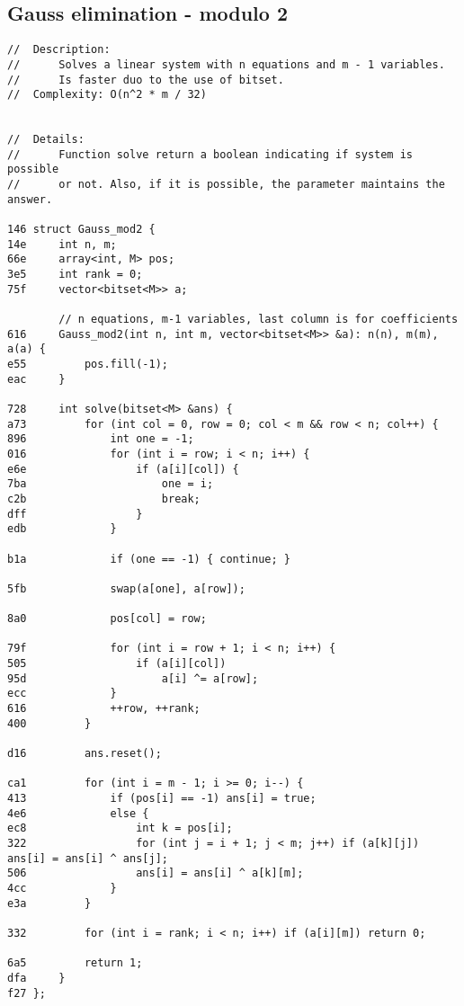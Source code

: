 \documentclass[11pt, a4paper, twoside]{article}
\begin{document}
\subsection{ Gauss elimination - modulo 2}
\begin{lstlisting}
//  Description: 
//      Solves a linear system with n equations and m - 1 variables.
//      Is faster duo to the use of bitset.
//  Complexity: O(n^2 * m / 32)


//  Details:
//      Function solve return a boolean indicating if system is possible
//      or not. Also, if it is possible, the parameter maintains the answer.

146 struct Gauss_mod2 {
14e     int n, m;
66e     array<int, M> pos;
3e5     int rank = 0;
75f     vector<bitset<M>> a;
     
        // n equations, m-1 variables, last column is for coefficients
616     Gauss_mod2(int n, int m, vector<bitset<M>> &a): n(n), m(m), a(a) {
e55         pos.fill(-1);
eac     }
     
728     int solve(bitset<M> &ans) {
a73         for (int col = 0, row = 0; col < m && row < n; col++) {
896             int one = -1;
016             for (int i = row; i < n; i++) {
e6e                 if (a[i][col]) {
7ba                     one = i;
c2b                     break;
dff                 }
edb             }
     
b1a             if (one == -1) { continue; }
     
5fb             swap(a[one], a[row]);
     
8a0             pos[col] = row;
     
79f             for (int i = row + 1; i < n; i++) {
505                 if (a[i][col])
95d                     a[i] ^= a[row];
ecc             }
616             ++row, ++rank;
400         }
     
d16         ans.reset();
     
ca1         for (int i = m - 1; i >= 0; i--) {
413             if (pos[i] == -1) ans[i] = true;
4e6             else {
ec8                 int k = pos[i];
322                 for (int j = i + 1; j < m; j++) if (a[k][j]) ans[i] = ans[i] ^ ans[j];
506                 ans[i] = ans[i] ^ a[k][m];
4cc             }
e3a         }
     
332         for (int i = rank; i < n; i++) if (a[i][m]) return 0;
     
6a5         return 1;
dfa     }
f27 };
\end{lstlisting}
\end{document}
